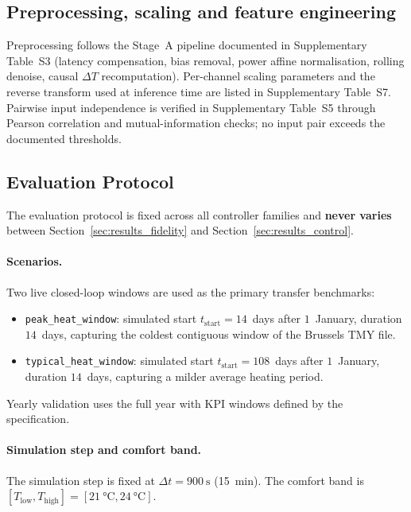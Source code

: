 \subsection{Preprocessing, scaling and feature engineering}
\label{ssec:exp_preprocessing}

Preprocessing follows the Stage~A pipeline documented in
Supplementary Table~S3 (latency compensation, bias removal, power
affine normalisation, rolling denoise, causal $\Delta T$
recomputation). Per-channel scaling parameters and the reverse
transform used at inference time are listed in Supplementary
Table~S7. Pairwise input independence is verified in Supplementary
Table~S5 through Pearson correlation and mutual-information checks;
no input pair exceeds the documented thresholds.

\subsection{Evaluation Protocol}
\label{ssec:exp_eval_protocol}

The evaluation protocol is fixed across all controller families and
\textbf{never varies} between Section~\ref{sec:results_fidelity} and
Section~\ref{sec:results_control}.

\paragraph{Scenarios.}
Two live \boptest{} closed-loop windows are used as the primary transfer
benchmarks:
\begin{itemize}
    \item \texttt{peak\_heat\_window}: simulated start
    $t_{\mathrm{start}} = 14$~days after $1$~January, duration
    $14$~days, capturing the coldest contiguous window of the Brussels
    TMY file.
    \item \texttt{typical\_heat\_window}: simulated start
    $t_{\mathrm{start}} = 108$~days after $1$~January, duration
    $14$~days, capturing a milder average heating period.
\end{itemize}
Yearly validation uses the full \boptest{} year with KPI windows defined by
the \boptest{} specification.

\paragraph{Simulation step and comfort band.}
The simulation step is fixed at $\Delta t = \SI{900}{\second}$ (\SI{15}{\minute}).
The comfort band is $[T_{\mathrm{low}}, T_{\mathrm{high}}] = [\SI{21}{\celsius}, \SI{24}{\celsius}]$.

